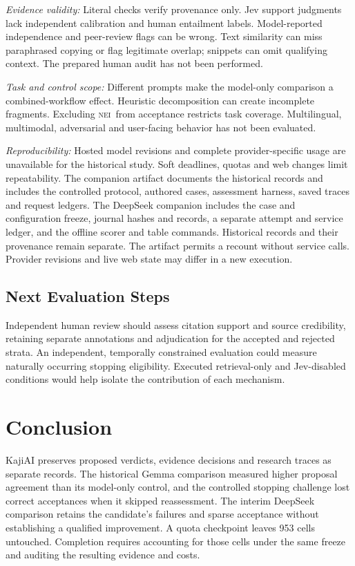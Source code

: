\documentclass[conference]{IEEEtran}
\newcommand{\NEI}{\textsc{nei}}
\begin{document}
\textit{Evidence validity:} Literal checks verify provenance only. Jev support judgments lack independent calibration and human entailment labels. Model-reported independence and peer-review flags can be wrong. Text similarity can miss paraphrased copying or flag legitimate overlap; snippets can omit qualifying context. The prepared human audit has not been performed.

\textit{Task and control scope:} Different prompts make the model-only comparison a combined-workflow effect. Heuristic decomposition can create incomplete fragments. Excluding \NEI\ from acceptance restricts task coverage. Multilingual, multimodal, adversarial and user-facing behavior has not been evaluated.

\textit{Reproducibility:} Hosted model revisions and complete provider-specific usage are unavailable for the historical study. Soft deadlines, quotas and web changes limit repeatability. The companion artifact documents the historical records and includes the controlled protocol, authored cases, assessment harness, saved traces and request ledgers. The DeepSeek companion includes the case and configuration freeze, journal hashes and records, a separate attempt and service ledger, and the offline scorer and table commands. Historical records and their provenance remain separate. The artifact permits a recount without service calls. Provider revisions and live web state may differ in a new execution.

\subsection{Next Evaluation Steps}
Independent human review should assess citation support and source credibility, retaining separate annotations and adjudication for the accepted and rejected strata. An independent, temporally constrained evaluation could measure naturally occurring stopping eligibility. Executed retrieval-only and Jev-disabled conditions would help isolate the contribution of each mechanism.

\section{Conclusion}
KajiAI preserves proposed verdicts, evidence decisions and research traces as separate records. The historical Gemma comparison measured higher proposal agreement than its model-only control, and the controlled stopping challenge lost correct acceptances when it skipped reassessment. The interim DeepSeek comparison retains the candidate's failures and sparse acceptance without establishing a qualified improvement. A quota checkpoint leaves 953 cells untouched. Completion requires accounting for those cells under the same freeze and auditing the resulting evidence and costs.
\end{document}
